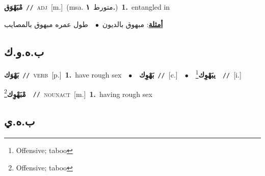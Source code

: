 \documentclass[10pt,a4paper,twoside]{article} %
\begin{document}
\begin{multicols}{2}
{\setlength\topsep{0pt}\textbf{\foreignlanguage{arabic}{مْبَهْوَق}}\ {\color{gray}\texttt{//}\color{black}}\ \textsc{adj}\ [m.]\ \color{gray}(msa. \foreignlanguage{arabic}{متورط}~\foreignlanguage{arabic}{\textbf{١.}})\color{black}\ \textbf{1.}~entangled in\  \begin{flushright}\color{gray}\foreignlanguage{arabic}{\textbf{\underline{\foreignlanguage{arabic}{أمثلة}}}: مبهوق بالديون\ $\bullet$\ \  طول عمره مبهوق بالمصايب}\end{flushright}\color{black}} \vspace{2mm}

\vspace{-3mm}
\subsection*{\color{blue}\foreignlanguage{arabic}{ب.ه.و.ك}\color{blue}{}} 

{\setlength\topsep{0pt}\textbf{\foreignlanguage{arabic}{بَهْوَك}}\ {\color{gray}\texttt{//}\color{black}}\ \textsc{verb}\ [p.]\ \textbf{1.}~have rough sex\ \ $\bullet$\ \ \setlength\topsep{0pt}\textbf{\foreignlanguage{arabic}{بَهْوِك}}\ {\color{gray}\texttt{//}\color{black}}\ [c.]\ \ $\bullet$\ \ \setlength\topsep{0pt}\textbf{\foreignlanguage{arabic}{يبَهْوِك}}\footnote{Offensive; taboo}\ \ {\color{gray}\texttt{//}\color{black}}\ [i.]\ } \vspace{2mm}

{\setlength\topsep{0pt}\textbf{\foreignlanguage{arabic}{مْبَهْوِك}}\footnote{Offensive; taboo}\ \ {\color{gray}\texttt{//}\color{black}}\ \textsc{noun\textunderscore act}\ [m.]\ \textbf{1.}~having rough sex\ } \vspace{2mm}

\vspace{-3mm}
\subsection*{\color{blue}\foreignlanguage{arabic}{ب.ه.ي}\color{blue}{}} 


\end{multicols}
\end{document}
